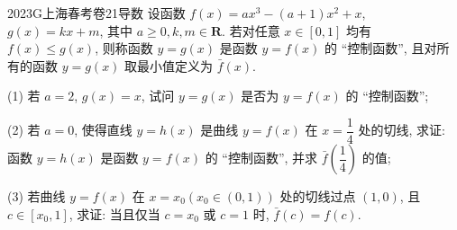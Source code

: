 
\begin{problem}{2023}{G}{上海春考卷}{21}{导数}
设函数 $f(x) = ax^3 - (a+1)x^2 + x$, $g(x) = kx + m$, 其中 $a \ge 0, k, m \in \mathbf{R}$. 若对任意 $x \in [0, 1]$ 均有 $f(x) \le g(x)$, 则称函数 $y = g(x)$ 是函数 $y = f(x)$ 的 “控制函数”, 且对所有的函数 $y = g(x)$ 取最小值定义为 $\bar{f}(x)$.

(1) 若 $a=2$, $g(x) = x$, 试问 $y = g(x)$ 是否为 $y = f(x)$ 的 “控制函数”;

(2) 若 $a=0$, 使得直线 $y = h(x)$ 是曲线 $y = f(x)$ 在 $x = \dfrac{1}{4}$ 处的切线, 求证: 函数 $y = h(x)$ 是函数 $y = f(x)$ 的 “控制函数”, 并求 $\bar{f}\left(\dfrac{1}{4}\right)$ 的值;

(3) 若曲线 $y = f(x)$ 在 $x = x_0 (x_0 \in (0, 1))$ 处的切线过点 $(1, 0)$, 且 $c \in [x_0, 1]$, 求证: 当且仅当 $c = x_0$ 或 $c = 1$ 时, $\bar{f}(c) = f(c)$.
\end{problem}